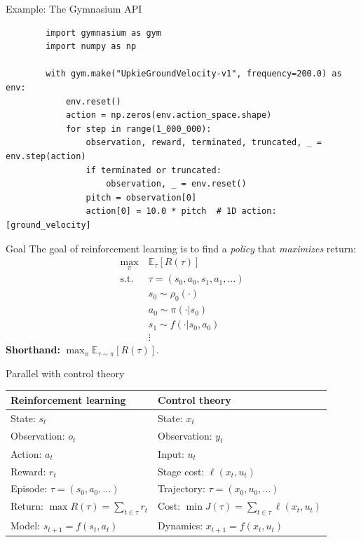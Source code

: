 \documentclass[11pt, aspectratio=169]{beamer}
\begin{document}
\begin{frame}[fragile]{Example: The Gymnasium API}
    \begin{verbatim}
        import gymnasium as gym
        import numpy as np

        with gym.make("UpkieGroundVelocity-v1", frequency=200.0) as env:
            env.reset()
            action = np.zeros(env.action_space.shape)
            for step in range(1_000_000):
                observation, reward, terminated, truncated, _ = env.step(action)
                if terminated or truncated:
                    observation, _ = env.reset()
                pitch = observation[0]
                action[0] = 10.0 * pitch  # 1D action: [ground_velocity]
    \end{verbatim}
\end{frame}

\begin{frame}{Goal}
    The goal of reinforcement learning is to find a \emph{policy} that \emph{maximizes} return:
    \begin{align*}
        \max_{\pi} \ & \mathbb{E}_{\tau} [R(\tau)] \\
        \mathrm{s.t.} \ & \tau = (s_0, a_0, s_1, a_1, \ldots) \\
        & s_0 \sim \rho_0(\cdot) \\
        & a_0 \sim \pi(\cdot | s_0) \\
        & s_1 \sim f(\cdot | s_0, a_0) \\
        & \vdots
    \end{align*}
    \textbf{Shorthand:} $\max_\pi \mathbb{E}_{\tau \sim \pi}[R(\tau)]$.
\end{frame}

\begin{frame}{Parallel with control theory}
    \begin{table}
        \begin{tabular}{ll}
            \textbf{Reinforcement learning} & \textbf{Control theory} \\
            \hline
            State: $s_t$ & State: $x_t$ \\
            Observation: $o_t$ & Observation: $y_t$ \\
            Action: $a_t$ & Input: $u_t$ \\
            Reward: $r_t$ & Stage cost: $\ell(x_t, u_t)$ \\
            Episode: $\tau = (s_0, a_0, \ldots)$ & Trajectory: $\tau = (x_0, u_0, \ldots)$ \\
            Return: $\max R(\tau) = \sum_{t \in \tau} r_t$ & Cost: $\min J(\tau) = \sum_{t \in \tau} \ell(x_t, u_t)$ \\
            Model: $s_{t+1} = f(s_t, a_t)$ & Dynamics: $x_{t+1} = f(x_t, u_t)$ \\
        \end{tabular}
    \end{table}
\end{frame}
\end{document}
